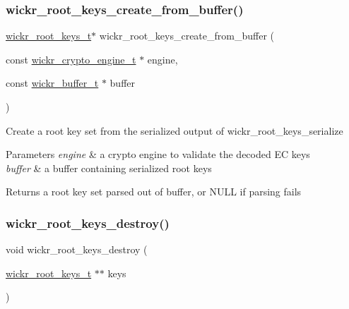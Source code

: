 \subsubsection{\texorpdfstring{wickr\_root\_keys\_create\_from\_buffer()}{wickr\_root\_keys\_create\_from\_buffer()}}
{\footnotesize\ttfamily \mbox{\hyperlink{structwickr__root__keys}{wickr\+\_\+root\+\_\+keys\+\_\+t}}$\ast$ wickr\+\_\+root\+\_\+keys\+\_\+create\+\_\+from\+\_\+buffer (\begin{DoxyParamCaption}\item[{const \mbox{\hyperlink{structwickr__crypto__engine}{wickr\+\_\+crypto\+\_\+engine\+\_\+t}} $\ast$}]{engine,  }\item[{const \mbox{\hyperlink{structwickr__buffer}{wickr\+\_\+buffer\+\_\+t}} $\ast$}]{buffer }\end{DoxyParamCaption})}

Create a root key set from the serialized output of \textquotesingle{}wickr\+\_\+root\+\_\+keys\+\_\+serialize\textquotesingle{}


\begin{DoxyParams}{Parameters}
{\em engine} & a crypto engine to validate the decoded EC keys \\
\hline
{\em buffer} & a buffer containing serialized root keys \\
\hline
\end{DoxyParams}
\begin{DoxyReturn}{Returns}
a root key set parsed out of buffer, or N\+U\+LL if parsing fails 
\end{DoxyReturn}
\mbox{\label{group__wickr__root__keys_gacabc33b7c56cbc84a5085d0a4330694f}} 
\subsubsection{\texorpdfstring{wickr\_root\_keys\_destroy()}{wickr\_root\_keys\_destroy()}}
{\footnotesize\ttfamily void wickr\+\_\+root\+\_\+keys\+\_\+destroy (\begin{DoxyParamCaption}\item[{\mbox{\hyperlink{structwickr__root__keys}{wickr\+\_\+root\+\_\+keys\+\_\+t}} $\ast$$\ast$}]{keys }\end{DoxyParamCaption})}

